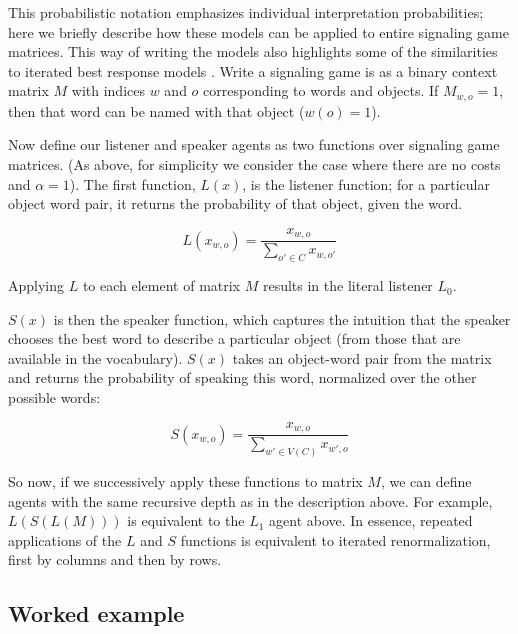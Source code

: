 \documentclass[man,noapacite]{apa2}
\begin{document}
This probabilistic notation emphasizes individual interpretation probabilities; here we briefly describe how these models can be applied to entire signaling game matrices. This way of writing the models also highlights some of the similarities to iterated best response models \cite{jager2010}. Write a signaling game is as a binary context matrix $M$ with indices $w$ and $o$ corresponding to words and objects. If $M_{w,o} = 1$, then that word can be named with that object ($w(o) = 1$).

Now define our listener and speaker agents as two functions over signaling game matrices. (As above, for simplicity we consider the case where there are no costs and $\alpha=1$). The first function, $L(x)$, is the listener function; for a particular object word pair, it returns the probability of that object, given the word.

\begin{equation}
L(x_{w,o}) = \frac{x_{w,o}}{\displaystyle\sum_{o' \in C} x_{w,o'} }
\end{equation}

\noindent Applying $L$ to each element of matrix $M$ results in the literal listener $L_0$.

$S(x)$ is then the speaker function, which captures the intuition that the speaker chooses the best word to describe a particular object (from those that are available in the vocabulary). $S(x)$ takes an object-word pair from the matrix and returns the probability of speaking this word, normalized over the other possible words:

\begin{equation}
S(x_{w,o}) = \frac{x_{w,o}}{\displaystyle \sum_{w' \in V(C)} x_{w',o}}
\end{equation}

So now, if we successively apply these functions to matrix $M$, we can define agents with the same recursive depth as in the description above. For example, $L(S(L(M)))$ is equivalent to the $L_1$ agent above. In essence, repeated applications of the $L$ and $S$ functions is equivalent to iterated renormalization, first by columns and then by rows.

\subsection{Worked example}
\end{document}
